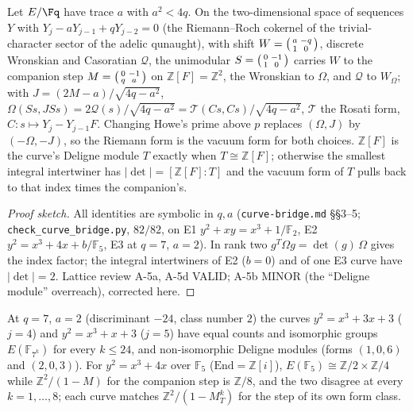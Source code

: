 \begin{theorem}
\label{thm:gkp-genus-one-bridge} 
Let $E/\Fq$ have trace $a$ with $a^2<4q$. On the two-dimensional space of sequences $Y$ with $Y_j-aY_{j-1}+qY_{j-2} = 0$ (the Riemann--Roch cokernel of the trivial-character
sector of the adelic qunaught), with shift $W = \begin{psmallmatrix}a&-q\\1&0\end{psmallmatrix}$, discrete Wronskian and Casoratian $\mathcal Q$, the unimodular $S =
\begin{psmallmatrix}0&-1\\1&0\end{psmallmatrix}$ carries $W$ to the companion step $M = \begin{psmallmatrix}0&-1\\q&a\end{psmallmatrix}$ on $\mathbb Z[F] = \mathbb Z^2$, the Wronskian
to $\Omega$, and $\mathcal Q$ to $W_\Omega$; with $J = (2M-a)/\sqrt{4q-a^2}$, $\Omega(Ss,JSs) = 2\mathcal Q(s)/\sqrt{4q-a^2} = \mathcal T(Cs,Cs)/\sqrt{4q-a^2}$, $\mathcal T$ the %
Rosati form, $C:s\mapsto Y_j-Y_{j-1}F$. Changing Howe's prime above $p$ replaces $(\Omega,J)$ by $(-\Omega,-J)$, so the Riemann form is the vacuum form for both choices. $\mathbb %
Z[F]$ is the curve's Deligne module $T$ exactly when $T\cong\mathbb Z[F]$; otherwise the smallest integral intertwiner has $|\det| = [\mathbb Z[F]:T]$ and the vacuum form of $T$
pulls back to that index times the companion's.
\end{theorem}
\begin{proof}[Proof sketch] All identities are symbolic in $q,a$ (\texttt{curve-bridge.md} \S\S3--5; \texttt{check\_curve\_bridge.py}, $82/82$, on E1 $y^2+xy = x^3+1/\mathbb
F_2$, E2 $y^2 = x^3+4x+b/\mathbb F_5$, E3 at $q = 7$, $a = 2$). In rank two $g^T\Omega g = \det(g)\,\Omega$ gives the index factor; the integral intertwiners of E2 ($b = 0$) and %
of one E3 curve have $|\det| = 2$. Lattice review A-5a, A-5d VALID; A-5b MINOR (the ``Deligne module'' overreach), corrected here.
\end{proof}
\begin{numerical}
\label{num:gkp-counts-not-lattice} 
At $q = 7$, $a = 2$ (discriminant $-24$, class number $2$) the curves $y^2 = x^3+3x+3$ ($j = 4$) and $y^2 = x^3+x+3$ ($j = 5$) have equal counts and isomorphic groups $E(\mathbb
F_{7^k})$ for every $k\le24$, and non-isomorphic Deligne modules (forms $(1,0,6)$ and $(2,0,3)$). For $y^2 = x^3+4x$ over $\mathbb F_5$ ($\mathrm{End} = \mathbb Z[i]$),
$E(\mathbb F_5)\cong\mathbb Z/2\times\mathbb Z/4$ while $\mathbb Z^2/(1-M)$ for the companion step is $\mathbb Z/8$, and the two disagree at every $k = 1,\dots,8$; each curve
matches $\mathbb Z^2/(1-M_T^k)$ for the step of its own form class.
\end{numerical}
